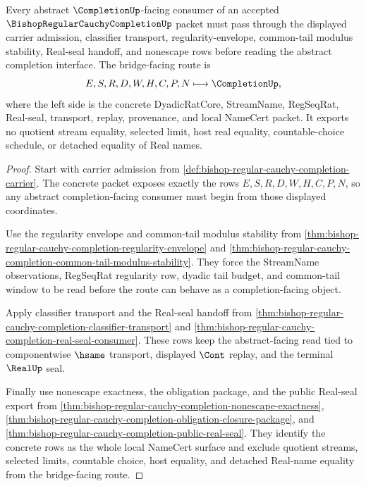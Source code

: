 \begin{theorem}
\label{thm:bishop-regular-cauchy-completion-abstract-bridge-route}
Every abstract $\CompletionUp$-facing consumer of an accepted $\BishopRegularCauchyCompletionUp$ packet must pass through the displayed carrier admission, classifier transport, regularity-envelope, common-tail modulus stability, Real-seal handoff, and nonescape rows before reading the abstract completion interface. The bridge-facing route is
$$
E,S,R,D,W,H,C,P,N \longmapsto \CompletionUp,
$$
where the left side is the concrete DyadicRatCore, StreamName, RegSeqRat, Real-seal, transport, replay, provenance, and local NameCert packet. It exports no quotient stream equality, selected limit, host real equality, countable-choice schedule, or detached equality of Real names.
\end{theorem}
\begin{proof}
Start with carrier admission from \autoref{def:bishop-regular-cauchy-completion-carrier}. The concrete packet exposes exactly the rows $E,S,R,D,W,H,C,P,N$, so any abstract completion-facing consumer must begin from those displayed coordinates.

Use the regularity envelope and common-tail modulus stability from \autoref{thm:bishop-regular-cauchy-completion-regularity-envelope} and \autoref{thm:bishop-regular-cauchy-completion-common-tail-modulus-stability}. They force the StreamName observations, RegSeqRat regularity row, dyadic tail budget, and common-tail window to be read before the route can behave as a completion-facing object.

Apply classifier transport and the Real-seal handoff from \autoref{thm:bishop-regular-cauchy-completion-classifier-transport} and \autoref{thm:bishop-regular-cauchy-completion-real-seal-consumer}. These rows keep the abstract-facing read tied to componentwise $\hsame$ transport, displayed $\Cont$ replay, and the terminal $\RealUp$ seal.

Finally use nonescape exactness, the obligation package, and the public Real-seal export from \autoref{thm:bishop-regular-cauchy-completion-nonescape-exactness}, \autoref{thm:bishop-regular-cauchy-completion-obligation-closure-package}, and \autoref{thm:bishop-regular-cauchy-completion-public-real-seal}. They identify the concrete rows as the whole local NameCert surface and exclude quotient streams, selected limits, countable choice, host equality, and detached Real-name equality from the bridge-facing route.
\end{proof}

